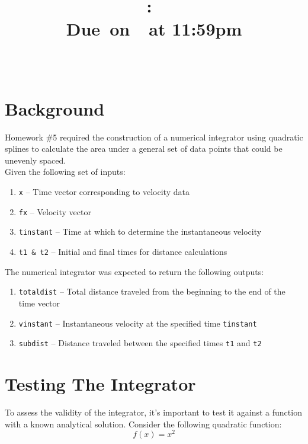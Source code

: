 \documentclass{article}
\title{
    \vspace{2in}
    \textmd{\textbf{\hmwkClass:\ \hmwkTitle}}\\
    \normalsize\vspace{0.1in}\small{Due\ on\ \hmwkDueDate\ at 11:59pm}\\
    \vspace{0.1in}\large{\textit{\hmwkClassInstructor\ \hmwkClassTime}}
    \vspace{3in}
}
\author{\hmwkAuthorName}
\date{}
\newcommand{\mat}[1]{\lstinline[style=matlabstyle]|#1|}
\begin{document}
\maketitle

\pagebreak

\tableofcontents

\pagebreak

\section{Background}
Homework \#5 required the construction of a numerical integrator using quadratic splines to calculate the area under a general set of data points that could be unevenly spaced. \\

Given the following set of inputs:
\begin{enumerate}
    \item \mat{x} -- Time vector corresponding to velocity data
    \item \mat{fx} -- Velocity vector
    \item \mat{tinstant} -- Time at which to determine the instantaneous velocity
    \item \mat{t1 & t2} -- Initial and final times for distance calculations
\end{enumerate}

The numerical integrator was expected to return the following outputs:
\begin{enumerate}
    \item \mat{totaldist} -- Total distance traveled from the beginning to the end of the time vector
    \item \mat{vinstant} -- Instantaneous velocity at the specified time \mat{tinstant}
    \item \mat{subdist} -- Distance traveled between the specified times \mat{t1} and \mat{t2}
\end{enumerate}

\section{Testing The Integrator}

To assess the validity of the integrator, it's important to test it against a function with a known analytical solution. Consider the following quadratic function:
\begin{equation}
    f(x) = x^2
    \label{eq:quad}
\end{equation}
\end{document}
